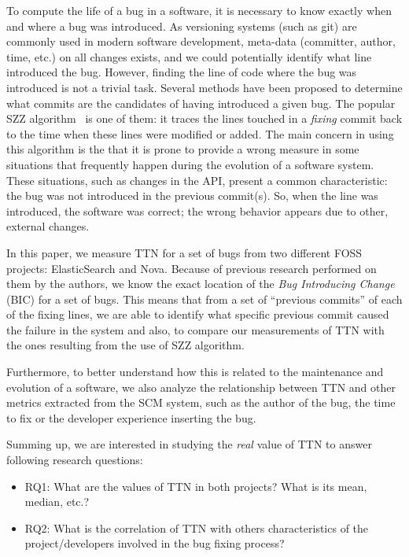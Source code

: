 \documentclass[10pt, conference]{IEEEtran}
\begin{document}
To compute the life of a bug in a software, it is necessary to know exactly when and where a bug was introduced. As versioning systems (such as git) are commonly used in modern software development, meta-data (committer, author, time, etc.) on all changes exists, and we could potentially identify what line introduced the bug. However, finding the line of code where the bug was introduced is not a trivial task. Several methods have been proposed to determine what commits are the candidates of having introduced a given bug. The popular SZZ algorithm~\cite{sliwerski2005changes} is one of them: it traces the lines touched in a \emph{fixing} commit back to the time when these lines were modified or added. The main concern in using this algorithm is the that it is prone to provide a wrong measure in some situations that frequently happen during the evolution of a software system. These situations, such as changes in the API, present a common characteristic: the bug was not introduced in the previous commit(s). So, when the line was introduced, the software was correct; the wrong behavior appears due to other, external changes.


In this paper, we measure TTN for a set of bugs from two different FOSS projects: ElasticSearch and Nova. Because of previous research performed on them by the authors, we know the exact location of the \emph{Bug Introducing Change} (BIC) for a set of bugs. This means that from a set of ``previous commits'' of each of the fixing lines, we are able to identify what specific previous commit caused the failure in the system and also, to compare our measurements of TTN with the ones resulting from the use of SZZ algorithm.

Furthermore, to better understand how this is related to the maintenance and evolution of a software, we also analyze the relationship between TTN and other metrics extracted from the SCM system, such as the author of the bug, the time to fix or the developer experience inserting the bug.

Summing up, we are interested in studying the \emph{real} value of TTN to answer following research questions:
\begin{itemize}
  \item RQ1: What are the values of TTN in both projects? What is its mean, median, etc.?
  \item RQ2: What is the correlation of TTN with others characteristics of the project/developers involved in the bug fixing process? 
\end{itemize}
\end{document}
